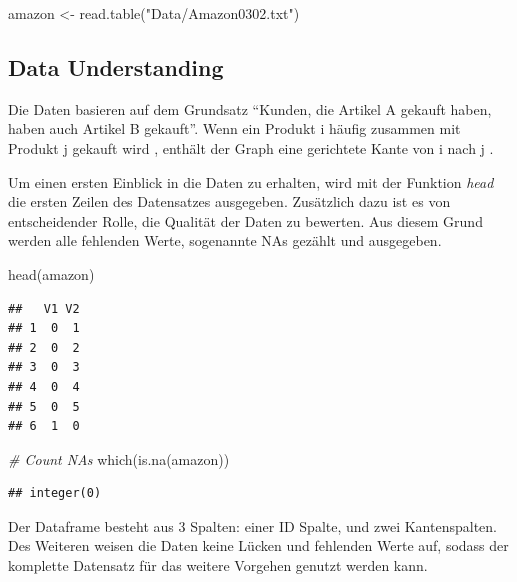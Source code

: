 \documentclass[
  12 pt,
]{article}
\newenvironment{Shaded}{\begin{snugshade}}{\end{snugshade}}
\newcommand{\CommentTok}[1]{\textcolor[rgb]{0.56,0.35,0.01}{\textit{#1}}}
\newcommand{\FunctionTok}[1]{\textcolor[rgb]{0.00,0.00,0.00}{#1}}
\newcommand{\NormalTok}[1]{#1}
\newcommand{\OtherTok}[1]{\textcolor[rgb]{0.56,0.35,0.01}{#1}}
\newcommand{\StringTok}[1]{\textcolor[rgb]{0.31,0.60,0.02}{#1}}
\begin{document}
\begin{Shaded}
\begin{Highlighting}[]
\NormalTok{amazon }\OtherTok{\textless{}{-}} \FunctionTok{read.table}\NormalTok{(}\StringTok{"Data/Amazon0302.txt"}\NormalTok{)}
\end{Highlighting}
\end{Shaded}

\hypertarget{data-understanding}{%
\subsection{Data Understanding}\label{data-understanding}}

Die Daten basieren auf dem Grundsatz ``Kunden, die Artikel A gekauft
haben, haben auch Artikel B gekauft''. Wenn ein Produkt i häufig
zusammen mit Produkt j gekauft wird , enthält der Graph eine gerichtete
Kante von i nach j .

Um einen ersten Einblick in die Daten zu erhalten, wird mit der Funktion
\textit{head} die ersten Zeilen des Datensatzes ausgegeben. Zusätzlich
dazu ist es von entscheidender Rolle, die Qualität der Daten zu
bewerten. Aus diesem Grund werden alle fehlenden Werte, sogenannte NAs
gezählt und ausgegeben.\\

\begin{Shaded}
\begin{Highlighting}[]
\FunctionTok{head}\NormalTok{(amazon)}
\end{Highlighting}
\end{Shaded}

\begin{verbatim}
##   V1 V2
## 1  0  1
## 2  0  2
## 3  0  3
## 4  0  4
## 5  0  5
## 6  1  0
\end{verbatim}

\begin{Shaded}
\begin{Highlighting}[]
\CommentTok{\# Count NAs}
\FunctionTok{which}\NormalTok{(}\FunctionTok{is.na}\NormalTok{(amazon))}
\end{Highlighting}
\end{Shaded}

\begin{verbatim}
## integer(0)
\end{verbatim}

Der Dataframe besteht aus 3 Spalten: einer ID Spalte, und zwei
Kantenspalten. Des Weiteren weisen die Daten keine Lücken und fehlenden
Werte auf, sodass der komplette Datensatz für das weitere Vorgehen
genutzt werden kann.
\end{document}
